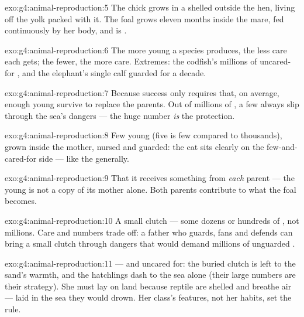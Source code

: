 \begin{solution}{exo:g4:animal-reproduction:5}
The chick grows in a shelled  outside the hen, living off
the yolk packed with it. The foal grows eleven months inside
the mare, fed continuously by her body, and is .
\end{solution}

\begin{solution}{exo:g4:animal-reproduction:6}
The more young a species produces, the less care each gets;
the fewer, the more care. Extremes: the codfish's millions of
uncared-for , and the elephant's single calf guarded for a
decade.
\end{solution}

\begin{solution}{exo:g4:animal-reproduction:7}
Because success only requires that, on average, enough young
survive to replace the parents. Out of millions of , a few
always slip through the sea's dangers --- the huge number
\emph{is} the protection.
\end{solution}

\begin{solution}{exo:g4:animal-reproduction:8}
Few young (five is few compared to thousands), grown inside the
mother, nursed and guarded: the cat sits clearly on the
few-and-cared-for side --- like the  generally.
\end{solution}

\begin{solution}{exo:g4:animal-reproduction:9}
That it receives something from \emph{each} parent --- the
young is not a copy of its mother alone. Both parents
contribute to what the foal becomes.
\end{solution}

\begin{solution}{exo:g4:animal-reproduction:10}
A small clutch --- some dozens or hundreds of , not
millions. Care and numbers trade off: a father who guards,
fans and defends can bring a small clutch through dangers that
would demand millions of unguarded .
\end{solution}

\begin{solution}{exo:g4:animal-reproduction:11}
 --- and uncared for: the buried clutch is left to
the sand's warmth, and the hatchlings dash to the sea alone
(their large numbers are their strategy). She must lay on land
because reptile  are shelled and breathe air --- laid in
the sea they would drown. Her class's features, not her
habits, set the rule.
\end{solution}
